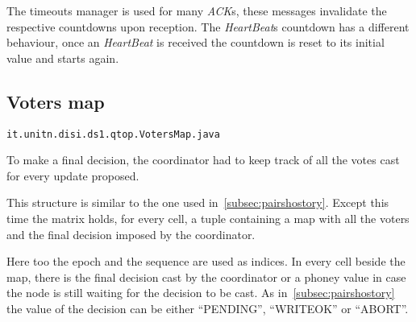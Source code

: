 The timeouts manager is used for many \textit{ACK}s, these messages invalidate the respective countdowns upon reception. The \textit{HeartBeat}s countdown has a different behaviour, once an \textit{HeartBeat} is received the countdown is reset to its initial value and starts again.

\subsection{Voters map}

\texttt{it.unitn.disi.ds1.qtop.VotersMap.java}

To make a final decision, the coordinator had to keep track of all the votes cast for every update proposed.

This structure is similar to the one used in~\ref{subsec:pairshostory}. Except this time the matrix holds, for every cell, a tuple containing a map with all the voters and the final decision imposed by the coordinator.

Here too the epoch and the sequence are used as indices. In every cell beside the map, there is the final decision cast by the coordinator or a phoney value in case the node is still waiting for the decision to be cast. As in~\ref{subsec:pairshostory} the value of the decision can be either ``PENDING'', ``WRITEOK'' or ``ABORT''.